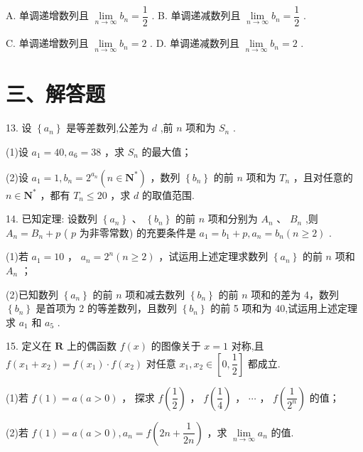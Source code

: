 A. 单调递增数列且 $\mathop{\lim }\limits_{{n \rightarrow  \infty }}{b}_{n} = \dfrac{1}{2}$ . B. 单调递减数列且 $\mathop{\lim }\limits_{{n \rightarrow  \infty }}{b}_{n} = \dfrac{1}{2}$ .

C. 单调递增数列且 $\mathop{\lim }\limits_{{n \rightarrow  \infty }}{b}_{n} = 2$ . D. 单调递减数列且 $\mathop{\lim }\limits_{{n \rightarrow  \infty }}{b}_{n} = 2$ .

\section*{三、解答题}

13. 设 $\left\{  {a}_{n}\right\}$ 是等差数列,公差为 $d$ ,前 $n$ 项和为 ${S}_{n}$ .

(1)设 ${a}_{1} = {40},{a}_{6} = {38}$ ，求 ${S}_{n}$ 的最大值；

(2)设 ${a}_{1} = 1,{b}_{n} = {2}^{{a}_{n}}\left( {n \in  {\mathbf{N}}^{ * }}\right)$ ，数列 $\left\{  {b}_{n}\right\}$ 的前 $n$ 项和为 ${T}_{n}$ ，且对任意的 $n \in  {\mathbf{N}}^{ * }$ ，都有 ${T}_{n} \leq  {20}$ ，求 $d$ 的取值范围.

14. 已知定理: 设数列 $\left\{  {a}_{n}\right\}$ 、 $\left\{  {b}_{n}\right\}$ 的前 $n$ 项和分别为 ${A}_{n}$ 、 ${B}_{n}$ ,则 ${A}_{n} = {B}_{n} + p$ ( $p$ 为非零常数) 的充要条件是 ${a}_{1} = {b}_{1} + p,{a}_{n} = {b}_{n}\left( {n \geq  2}\right)$ .

(1)若 ${a}_{1} = {10}$ ， ${a}_{n} = {2}^{n}\left( {n \geq  2}\right)$ ，试运用上述定理求数列 $\left\{  {a}_{n}\right\}$ 的前 $n$ 项和 ${A}_{n}$ ；

(2)已知数列 $\left\{  {a}_{n}\right\}$ 的前 $n$ 项和减去数列 $\left\{  {b}_{n}\right\}$ 的前 $n$ 项和的差为 4，数列 $\left\{  {b}_{n}\right\}$ 是首项为 2 的等差数列，且数列 $\left\{  {b}_{n}\right\}$ 的前 5 项和为 40,试运用上述定理求 ${a}_{1}$ 和 ${a}_{5}$ .

15. 定义在 $\mathbf{R}$ 上的偶函数 $f\left( x\right)$ 的图像关于 $x = 1$ 对称,且 $f\left( {{x}_{1} + {x}_{2}}\right)  = f\left( {x}_{1}\right)  \cdot  f\left( {x}_{2}\right)$ 对任意 ${x}_{1},{x}_{2} \in  \left\lbrack  {0,\dfrac{1}{2}}\right\rbrack$ 都成立.

(1)若 $f\left( 1\right)  = a\left( {a > 0}\right)$ ， 探求 $f\left( \dfrac{1}{2}\right)$ ， $f\left( \dfrac{1}{4}\right)$ ， $\cdots$ ， $f\left( \dfrac{1}{{2}^{n}}\right)$ 的值；

(2)若 $f\left( 1\right)  = a\left( {a > 0}\right) ,{a}_{n} = f\left( {{2n} + \dfrac{1}{2n}}\right)$ ，求 $\mathop{\lim }\limits_{{n \rightarrow  \infty }}{a}_{n}$ 的值.

